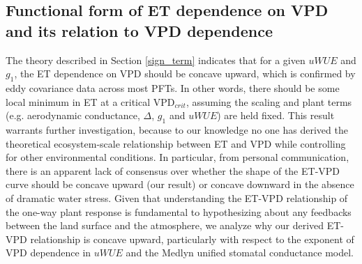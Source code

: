 \documentclass[draft,linenumbers]{afmjournal}
\begin{document}
\subsection{Functional form of ET dependence on VPD and its relation
  to VPD dependence}
\label{functional_form}

The theory described in Section \ref{sign_term} indicates that for a
given $uWUE$ and $g_1$, the ET dependence on VPD should be concave
upward, which is confirmed by eddy covariance data across most PFTs. In other words, there should be some local minimum in ET at a
critical VPD$_{crit}$, assuming the scaling and plant terms  (e.g. aerodynamic
conductance, $\Delta$, $g_1$ and $uWUE$) are held fixed. This result warrants further
investigation, because to our knowledge no one has derived the
theoretical ecosystem-scale relationship between ET and VPD while
controlling for other environmental conditions. In particular, from
personal communication, there is an apparent lack of consensus over
whether the shape of the ET-VPD curve should be concave upward (our
result) or concave downward in the absence of dramatic water stress. Given that understanding the ET-VPD
relationship of the one-way plant response is fundamental to
hypothesizing about any feedbacks between the land surface and the
atmosphere, we analyze why our derived ET-VPD relationship is concave
upward, particularly with respect to the exponent of VPD dependence in
$uWUE$ and the Medlyn unified stomatal conductance model.
\end{document}
